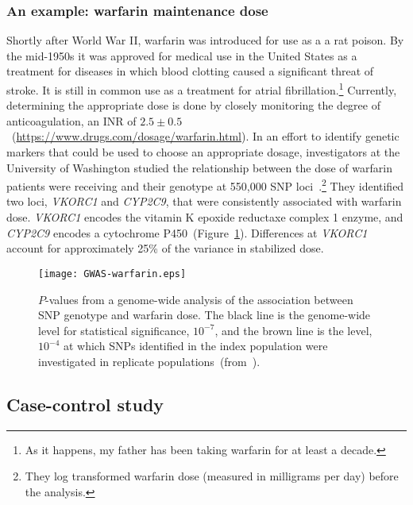\subsubsection*{An example: warfarin maintenance
  dose}

Shortly after World War II, warfarin was introduced for use as a a rat
poison. By the mid-1950s it was approved for medical use in the United
States as a treatment for diseases in which blood clotting caused a
significant threat of stroke. It is still in common use as a treatment
for atrial fibrillation.\footnote{As it happens, my father has been
  taking warfarin for at least a decade.} Currently, determining the
appropriate dose is done by closely monitoring the degree of
anticoagulation, an INR of
$2.5 \pm 0.5$~(\url{https://www.drugs.com/dosage/warfarin.html}). In
an effort to identify genetic markers that could be used to choose an
appropriate dosage, investigators at the University of Washington
studied the relationship between the dose of warfarin patients were
receiving and their genotype at 550,000 SNP
loci~\cite{Cooper-etal-2008}.\footnote{They log transformed warfarin
  dose (measured in milligrams per day) before the analysis.} They
identified two loci, {\it VKORC1} and {\it CYP2C9}, that were
consistently associated with warfarin dose. {\it VKORC1} encodes the
vitamin K epoxide reductaxe complex 1 enzyme, and {\it CYP2C9} encodes
a cytochrome P450~(Figure~\ref{fig:GWAS-warfarin}). Differences at
{\it VKORC1} account for approximately 25\% of the variance in
stabilized dose.

\begin{figure}
\begin{center}
\texttt{[image: GWAS-warfarin.eps]}
\end{center}
  \caption{$P$-values from a genome-wide analysis of the association
    between SNP genotype and warfarin dose. The black line is the
    genome-wide level for statistical significance, $10^{-7}$, and the
    brown line is the level, $10^{-4}$ at which SNPs identified in the
    index population were investigated in replicate
    populations~(from~\cite{Cooper-etal-2008}).}\label{fig:GWAS-warfarin}
\end{figure}

\subsection*{Case-control study}

